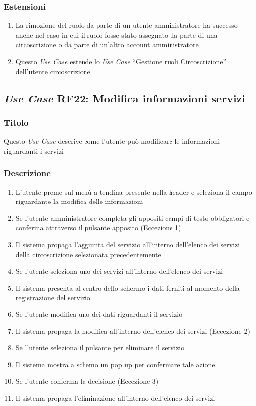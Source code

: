         \subsubsection{Estensioni}
            \begin{enumerate}
                \item La rimozione del ruolo da parte di un utente amministratore ha successo anche nel caso in cui il ruolo fosse stato assegnato da parte di una circoscrizione o da parte di un'altro account amministratore
                \item Questo \textit{Use Case} estende lo \textit{Use Case} ``Gestione ruoli Circoscrizione'' dell'utente circoscrizione
            \end{enumerate}

    \subsection{\textit{Use Case} RF22: Modifica informazioni servizi}
        \subsubsection{Titolo}
        Questo \textit{Use Case} descrive come l'utente può modificare le informazioni riguardanti i servizi
        \subsubsection{Descrizione}
            \begin{enumerate}
                \item L'utente preme sul menù a tendina presente nella header e seleziona il campo riguardante la modifica delle informazioni
                \item Se l'utente amministratore completa gli appositi campi di testo obbligatori e conferma attraverso il pulsante apposito (Eccezione 1)
                \item Il sistema propaga l'aggiunta del servizio all'interno dell'elenco dei servizi della circoscrizione selezionata precedentemente
                \item Se l'utente seleziona uno dei servizi all'interno dell'elenco dei servizi
                \item Il sistema presenta al centro dello schermo i dati forniti al momento della registrazione del servizio
                \item Se l'utente modifica uno dei dati riguardanti il servizio
                \item Il sistema propaga la modifica all'interno dell'elenco dei servizi (Eccezione 2)
                \item Se l'utente seleziona il pulsante per eliminare il servizio
                \item Il sistema mostra a schemo un pop up per confermare tale azione
                \item Se l'utente conferma la decisione (Eccezione 3)
                \item Il sistema propaga l'eliminazione all'interno dell'elenco dei servizi
            \end{enumerate}
